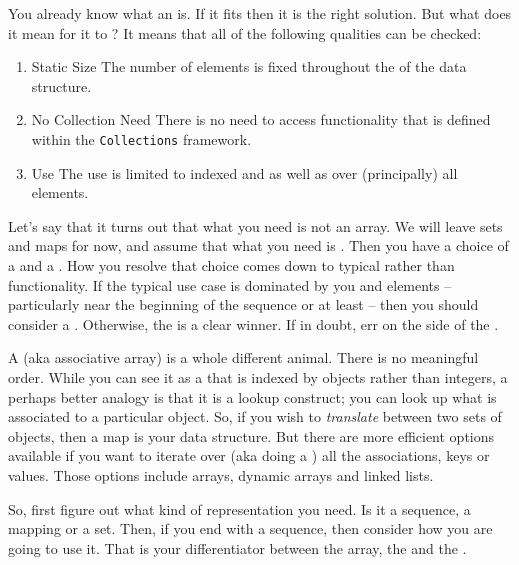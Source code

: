 You already know what an  is. If it fits then it is the right solution. But what does it mean for it to ? It means that all of the following qualities can be checked:
\begin{enumerate}
  \item{Static Size} The number of elements is fixed throughout the  of the data structure.
  \item{No Collection Need} There is no need to access functionality that is defined within the \texttt{Collections} framework.
  \item{Use} The use is limited to indexed  and  as well as  over (principally) all elements.
\end{enumerate}

Let's say that it turns out that what you need is not an array. We will leave sets and maps for now, and assume that what you need is . Then you have a choice of a  and a . How you resolve that choice comes down to typical  rather than functionality. If the typical use case is dominated by you  and  elements -- particularly near the beginning of the sequence or at least  -- then you should consider a . Otherwise, the  is a clear winner. If in doubt, err on the side of the .

\begin{inspiration}{\cite{linearscans1992}}
\end{inspiration}

A  (aka associative array) is a whole different animal. There is no meaningful order. While you can see it as a  that is indexed by objects rather than integers, a perhaps better analogy is that it is a lookup construct; you can look up what is associated to a particular object. So, if you wish to \textsl{translate} between two sets of objects, then a map is your data structure. But there are more efficient options available if you want to iterate over (aka doing a ) all the associations, keys or values. Those options include arrays, dynamic arrays and linked lists.


So, first figure out what kind of representation you need. Is it a sequence, a mapping or a set. Then, if you end with a sequence, then consider how you are going to use it. That is your differentiator between the array, the  and the .


